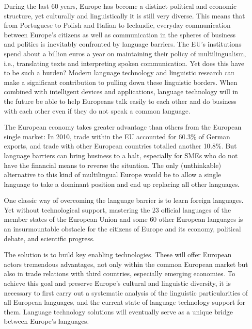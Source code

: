 \begin{multicols}{2}
\begin{itemize}

\begin{multicols}{2}
    
    During the last 60 years, Europe has become a distinct political and economic structure, yet culturally and linguistically it is still very diverse. This means that from Portuguese to Polish and Italian to Icelandic, everyday communication between Europe’s citizens as well as communication in the spheres of business and politics is inevitably confronted by language barriers. The EU’s institutions spend about a billion euros a year on maintaining their policy of multilingualism, i.e., translating texts and interpreting spoken communication. Yet does this have to be such a burden? Modern language technology and linguistic research can make a significant contribution to pulling down these linguistic borders. When combined with intelligent devices and applications, language technology will in the future be able to help Europeans talk easily to each other and do business with each other even if they do not speak a common language. 


    The European economy takes greater advantage than others from the European single market: In 2010, trade within the EU accounted for 60.3\% of German exports, and trade with other European countries totalled another 10.8\%. But language barriers can bring business to a halt, especially for SMEs who do not have the financial means to reverse the situation. The only (unthinkable) alternative to this kind of multilingual Europe would be to allow a single language to take a dominant position and end up replacing all other languages. 

    One classic way of overcoming the language barrier is to learn foreign languages. Yet without technological support, mastering the 23 official languages of the member states of the European Union and some 60 other European languages is an insurmountable obstacle for the citizens of Europe and its economy, political debate, and scientific progress. 

    The solution is to build key enabling technologies. These will offer European actors tremendous advantages, not only within the common European market but also in trade relations with third countries, especially emerging economies. To achieve this goal and preserve Europe’s cultural and linguistic diversity, it is necessary to first carry out a systematic analysis of the linguistic particularities of all European languages, and the current state of language technology support for them. Language technology solutions will eventually serve as a unique bridge between Europe’s languages. 


\end{multicols}
\end{itemize}
\end{multicols}
